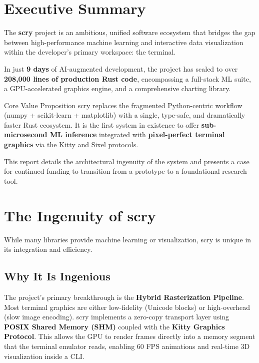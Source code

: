 \documentclass[11pt,a4paper]{article}
\begin{document}
\newpage
\tableofcontents
\newpage

\section{Executive Summary}

The \textbf{scry} project is an ambitious, unified software ecosystem that bridges the gap between high-performance machine learning and interactive data visualization within the developer's primary workspace: the terminal. 

In just \textbf{9 days} of AI-augmented development, the project has scaled to over \textbf{208,000 lines of production Rust code}, encompassing a full-stack ML suite, a GPU-accelerated graphics engine, and a comprehensive charting library. 

\begin{googlebox}{Core Value Proposition}
scry replaces the fragmented Python-centric workflow (numpy + scikit-learn + matplotlib) with a single, type-safe, and dramatically faster Rust ecosystem. It is the first system in existence to offer \textbf{sub-microsecond ML inference} integrated with \textbf{pixel-perfect terminal graphics} via the Kitty and Sixel protocols.
\end{googlebox}

This report details the architectural ingenuity of the system and presents a case for continued funding to transition from a prototype to a foundational research tool.

\section{The Ingenuity of scry}

While many libraries provide machine learning or visualization, scry is unique in its integration and efficiency.

\subsection{Why It Is Ingenious}

\begin{ingenuity}
The project's primary breakthrough is the \textbf{Hybrid Rasterization Pipeline}. Most terminal graphics are either low-fidelity (Unicode blocks) or high-overhead (slow image encoding). scry implements a zero-copy transport layer using \textbf{POSIX Shared Memory (SHM)} coupled with the \textbf{Kitty Graphics Protocol}. This allows the GPU to render frames directly into a memory segment that the terminal emulator reads, enabling 60 FPS animations and real-time 3D visualization inside a CLI.
\end{ingenuity}
\end{document}
